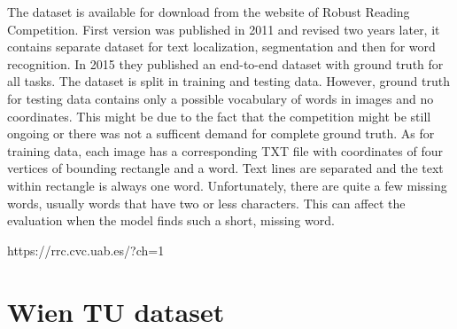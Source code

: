 The dataset is available for download from the website of Robust Reading Competition. First version was published in 2011 and revised two years later, it contains separate dataset for text localization, segmentation and then for word recognition. In 2015 they published an end-to-end dataset with ground truth for all tasks. The dataset is split in training and testing data. However, ground truth for testing data contains only a possible vocabulary of words in images and no coordinates. This might be due to the fact that the competition might be still ongoing or there was not a sufficent demand for complete ground truth. As for training data, each image has a corresponding TXT file with coordinates of four vertices of bounding rectangle and a word. Text lines are separated and the text within rectangle is always one word. Unfortunately, there are quite a few missing words, usually words that have two or less characters. This can affect the evaluation when the model finds such a short, missing word.

https://rrc.cvc.uab.es/?ch=1

\section{Wien TU dataset}

